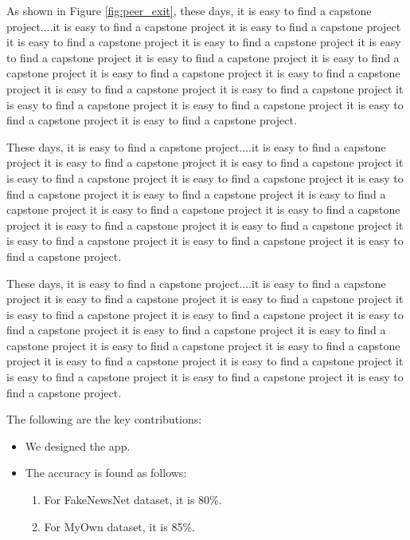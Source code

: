 \documentclass[11pt]{article}
\theoremstyle{plain}
\theoremstyle{definition}
\begin{document}
As shown in Figure \ref{fig:peer_exit}, these days, it is easy to find a capstone project....it is easy to find a capstone project it is easy to find a capstone project it is easy to find a capstone project it is easy to find a capstone project it is easy to find a capstone project it is easy to find a capstone project it is easy to find a capstone project it is easy to find a capstone project it is easy to find a capstone project it is easy to find a capstone project it is easy to find a capstone project it is easy to find a capstone project it is easy to find a capstone project it is easy to find a capstone project it is easy to find a capstone project.

	
These days, it is easy to find a capstone project....it is easy to find a capstone project it is easy to find a capstone project it is easy to find a capstone project it is easy to find a capstone project it is easy to find a capstone project it is easy to find a capstone project it is easy to find a capstone project it is easy to find a capstone project it is easy to find a capstone project it is easy to find a capstone project it is easy to find a capstone project it is easy to find a capstone project it is easy to find a capstone project it is easy to find a capstone project it is easy to find a capstone project.

These days, it is easy to find a capstone project....it is easy to find a capstone project it is easy to find a capstone project it is easy to find a capstone project it is easy to find a capstone project it is easy to find a capstone project it is easy to find a capstone project it is easy to find a capstone project it is easy to find a capstone project it is easy to find a capstone project it is easy to find a capstone project it is easy to find a capstone project it is easy to find a capstone project it is easy to find a capstone project it is easy to find a capstone project it is easy to find a capstone project.

The following are the key contributions:
\begin{itemize}
    \item We designed the app.
    \item The accuracy is found as follows:
    \begin{enumerate}
        \item For FakeNewsNet dataset, it is 80\%.
        \item For MyOwn dataset, it is 85\%.
    \end{enumerate}
\end{itemize}
\end{document}
